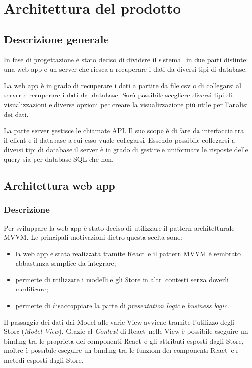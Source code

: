 \section{Architettura del prodotto}

\subsection{Descrizione generale}
In fase di progettazione è stato deciso di dividere il sistema \hd\ in due parti distinte: una web app e un server che riesca a recuperare i dati da diversi tipi di database.

La web app è in grado di recuperare i dati a partire da file csv o di collegarsi al server e recuperare i dati dal database. Sarà possibile scegliere diversi tipi di visualizzazioni e diverse opzioni per creare la visualizzazione più utile per l'analisi dei dati.

La parte server gestisce le chiamate API. Il suo scopo è di fare da interfaccia tra il client e il database a cui esso vuole collegarsi. Essendo possibile collegarsi a diversi tipi di database il server è in grado di gestire e uniformare le risposte delle query sia per database SQL che non.

\subsection{Architettura web app}
    \subsubsection{Descrizione}
    Per sviluppare la web app è stato deciso di utilizzare il pattern architetturale MVVM. Le principali motivazioni dietro questa scelta sono: 
    \begin{itemize}
        \item la web app è stata realizzata tramite React\glo\ e il pattern MVVM è sembrato abbastanza semplice da integrare;
        \item permette di utilizzare i modelli e gli Store in altri contesti senza doverli modificare;
        \item permette di disaccoppiare la parte di \emph{presentation logic} e \emph{business logic}.
    \end{itemize}
    
    Il passaggio dei dati dai Model alle varie View avviene tramite l'utilizzo degli Store (\emph{Model View}). Grazie al \emph{Context} di React\glo\ nelle View è possibile eseguire un binding tra le proprietà dei componenti React\glo\ e gli attributi esposti dagli Store, inoltre è possibile eseguire un binding tra le funzioni dei componenti React\glo\ e i metodi esposti dagli Store.
    

